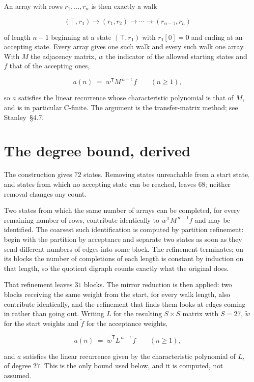 \documentclass[11pt]{article}
\theoremstyle{definition}
\begin{document}
An array with rows $r_1,\dots,r_n$ is then exactly a walk

\[(\top,r_1) \to (r_1,r_2) \to \cdots \to (r_{n-1},r_n)\]

of length $n-1$ beginning at a state $(\top,r_1)$ with $r_1[0]=0$ and ending at an accepting state. Every array gives one such walk and every such walk one array. With $M$ the adjacency matrix, $w$ the indicator of the allowed starting states and $f$ that of the accepting ones,

\[a(n) \;=\; w^{\mathsf T} M^{\,n-1} f \qquad (n \ge 1),\]

so $a$ satisfies the linear recurrence whose characteristic polynomial is that of $M$, and is in particular C-finite. The argument is the transfer-matrix method; see Stanley~\S4.7.

\section{The degree bound, derived}

The construction gives $72$ states. Removing states unreachable from a start state, and states from which no accepting state can be reached, leaves $68$; neither removal changes any count.

Two states from which the same number of arrays can be completed, for every remaining number of rows, contribute identically to $w^{\mathsf T}M^{\,n-1}f$ and may be identified. The coarsest such identification is computed by partition refinement: begin with the partition by acceptance and separate two states as soon as they send different numbers of edges into some block. The refinement terminates; on its blocks the number of completions of each length is constant by induction on that length, so the quotient digraph counts exactly what the original does.

That refinement leaves $31$ blocks. The mirror reduction is then applied: two blocks receiving the same weight from the start, for every walk length, also contribute identically, and the refinement that finds them looks at edges coming in rather than going out. Writing $L$ for the resulting $S \times S$ matrix with $S = 27$, $\tilde w$ for the start weights and $\tilde f$ for the acceptance weights,

\[a(n) \;=\; \tilde w^{\mathsf T} L^{\,n-1} \tilde f \qquad (n \ge 1),\]

and $a$ satisfies the linear recurrence given by the characteristic polynomial of $L$, of degree $27$. This is the only bound used below, and it is computed, not assumed.
\end{document}
